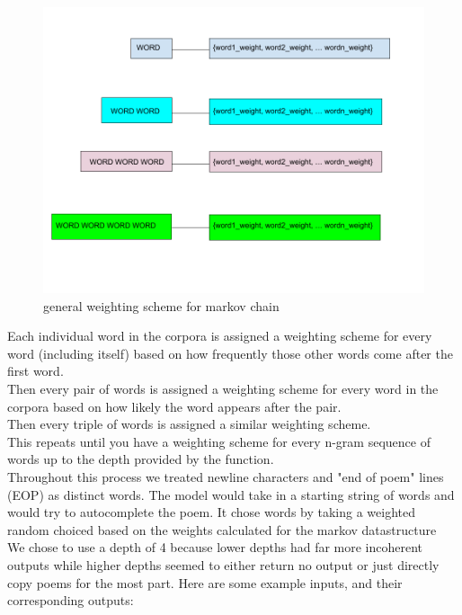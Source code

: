 \documentclass{article} %
\begin{document}
\begin{figure}[h]
  \begin{center}
  \includegraphics[width=1\textwidth]{Figs/MARKOV.png}
  \end{center}
  \caption{general weighting scheme for markov chain}
  \label{fig:plot}
  \end{figure}

Each individual word in the corpora is assigned a weighting scheme for every word (including itself) based on how frequently those other words come
after the first word.\\
Then every pair of words is assigned a weighting scheme for every word in the corpora based on how likely the word appears after the pair.\\
Then every triple of words is assigned a similar weighting scheme.\\
This repeats until you have a weighting scheme for every n-gram sequence of words up to the depth provided by the function.\\

Throughout this process we treated newline characters and "end of poem" lines (EOP) as distinct words. The model would take in a starting string of
words and would try to autocomplete the poem. It chose words by taking a weighted random choiced based on the weights calculated for the markov
datastructure\\

We chose to use a depth of 4 because lower depths had far more incoherent outputs while higher depths seemed to either return no output
or just directly copy poems for the most part. Here are some example inputs, and their corresponding outputs:\\
\end{document}
